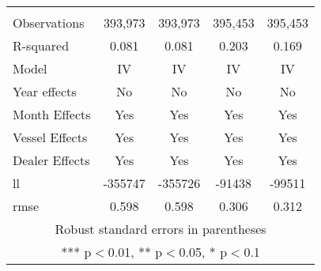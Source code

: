 \begin{tabular}{lcccc}
 &  &  &  &  \\
Observations & 393,973 & 393,973 & 395,453 & 395,453 \\
R-squared & 0.081 & 0.081 & 0.203 & 0.169 \\
Model & IV & IV & IV & IV \\
Year effects & No & No & No & No \\
Month Effects & Yes & Yes & Yes & Yes \\
Vessel Effects & Yes & Yes & Yes & Yes \\
Dealer Effects & Yes & Yes & Yes & Yes \\
ll & -355747 & -355726 & -91438 & -99511 \\
 rmse & 0.598 & 0.598 & 0.306 & 0.312 \\ \hline
\multicolumn{5}{c}{ Robust standard errors in parentheses} \\
\multicolumn{5}{c}{ *** p$<$0.01, ** p$<$0.05, * p$<$0.1} \\
\end{tabular}
